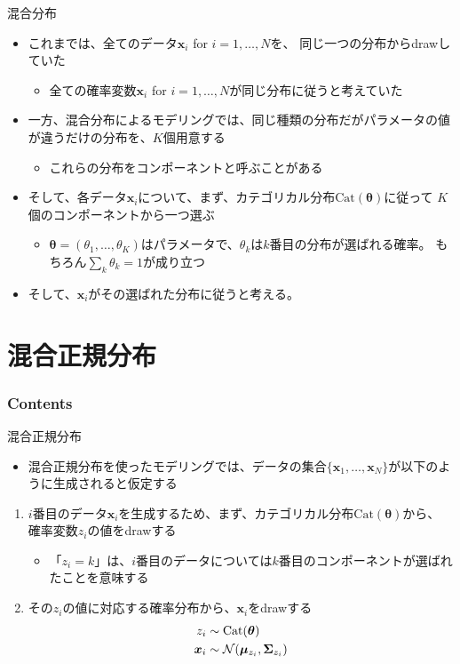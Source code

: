 \documentclass[aspectratio=169,unicode,dvipdfmx,14pt]{beamer}
\begin{document}
\begin{frame}{混合分布}
\begin{itemize}
\item これまでは、全てのデータ$\bm{x}_i$ for $i=1,\ldots,N$を、
同じ一つの分布からdrawしていた
\begin{itemize}
\item 全ての確率変数$\bm{x}_i$ for $i=1,\ldots,N$が同じ分布に従うと考えていた
\end{itemize}
\item 一方、混合分布によるモデリングでは、同じ種類の分布だがパラメータの値が違うだけの分布を、$K$個用意する
\begin{itemize}
\item これらの分布をコンポーネントと呼ぶことがある
\end{itemize}
\item そして、各データ$\bm{x}_i$について、まず、カテゴリカル分布$\mbox{Cat}(\bm{\theta})$に従って
$K$個のコンポーネントから一つ選ぶ
\begin{itemize}
\item $\bm{\theta}=(\theta_1,\ldots,\theta_K)$はパラメータで、$\theta_k$は$k$番目の分布が選ばれる確率。
もちろん$\sum_k \theta_k = 1$が成り立つ
\end{itemize}
\item そして、$\bm{x}_i$がその選ばれた分布に従うと考える。
\end{itemize}
\end{frame}


\section{混合正規分布}

\begin{frame}\frametitle{Contents}
\Large \tableofcontents[currentsection]
\end{frame}

\begin{frame}{混合正規分布}
\begin{itemize}
\item 混合正規分布を使ったモデリングでは、データの集合$\{\bm{x}_1, \ldots, \bm{x}_N\}$が以下のように生成されると仮定する
\end{itemize}
\begin{enumerate}
\item $i$番目のデータ$\bm{x}_i$を生成するため、まず、カテゴリカル分布$\mbox{Cat}(\bm{\theta})$から、
確率変数$z_i$の値をdrawする
\begin{itemize}
\item 「$z_i = k$」は、$i$番目のデータについては$k$番目のコンポーネントが選ばれたことを意味する
\end{itemize}
\item その$z_i$の値に対応する確率分布から、$\bm{x}_i$をdrawする
\begin{align}
z_i & \sim \mbox{Cat}(\bm{\theta}) \notag \\
\bm{x}_i & \sim \mathcal{N}(\bm{\mu}_{z_i}, \bm{\Sigma}_{z_i})
\end{align}
\end{enumerate}
\end{frame}
\end{document}
